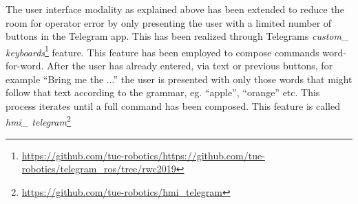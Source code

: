 \label{ssec:keyboard}
\noindent The user interface modality as explained above has been extended to reduce the room for operator error by only presenting the user with a limited number of buttons in the Telegram app. This has been realized through Telegrams \emph{custom\_ keyboards}\footnote{\url{https://github.com/tue-robotics/https://github.com/tue-robotics/telegram_ros/tree/rwc2019}} feature. %
This feature has been employed to compose commands word-for-word. After the user has already entered, via text or previous buttons, for example “Bring me the ...” the user is presented with only those words that might follow that text according to the grammar, eg. “apple”, “orange” etc. This process iterates until a full command has been composed. This feature is called \emph{hmi\_ telegram}\footnote{\url{https://github.com/tue-robotics/hmi_telegram}}